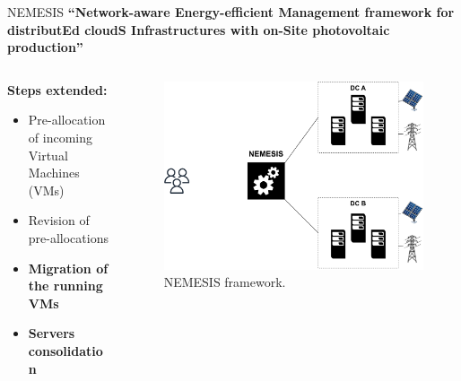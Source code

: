 \documentclass[Ligatures=TeX,table,svgnames,usetotalslideindicator,compress,10pt,aspectratio=169]{beamer}
\begin{document}
\begin{frame}{NEMESIS}
  \textbf {``\alert{N}etwork-aware \alert{E}nergy-efficient
    \alert{M}anagement framework for distribut\alert{E}d cloud\alert{S} \alert{I}nfrastructures with on-\alert{S}ite photovoltaic production''}
\begin{columns}        
    \begin{column}{0.4\textwidth}
\alert{\textbf{Steps extended:}}
\small
\begin{itemize}
    \item Pre-allocation of incoming Virtual Machines (VMs)
    \item Revision of pre-allocations
    \item \alert{\textbf{Migration of the running VMs}}
    \item \alert{\textbf{Servers consolidation}}
\end{itemize}
\end{column}

\begin{column}{0.6\textwidth}
      \begin{figure}[!h]
        \centering
        \includegraphics[width=.85\textwidth]{images/nemesis.pdf}
        \caption{NEMESIS framework.}
      \end{figure}
    \end{column}        

\end{columns}
\end{frame}
\end{document}
